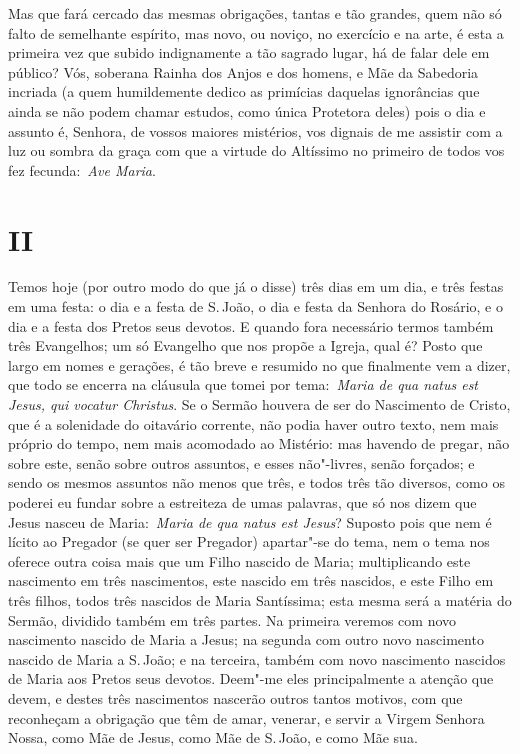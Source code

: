Mas que fará cercado das mesmas obrigações, tantas e tão
grandes, quem não só falto de semelhante espírito, mas novo, ou noviço,
no exercício e na arte, é esta a primeira vez que subido indignamente a
tão sagrado lugar, há de falar dele em público? Vós,
soberana Rainha dos Anjos e dos homens, e Mãe da Sabedoria incriada (a
quem humildemente dedico as primícias daquelas ignorâncias que ainda se
não podem chamar estudos, como única Protetora deles) pois o dia e
assunto é, Senhora, de vossos maiores mistérios, vos dignais de me
assistir com a luz ou sombra da graça com que a virtude do Altíssimo no
primeiro de todos vos fez fecunda:~\emph{Ave Maria}.


\section*{II}

Temos hoje (por outro modo do que já o disse) três dias em
um dia, e três festas em uma festa: o dia e a festa de S.\,João, o dia e
festa da Senhora do Rosário, e o dia e a festa dos Pretos seus devotos.
E quando fora necessário termos também três Evangelhos; um só Evangelho
que nos propõe a Igreja, qual é? Posto que largo em nomes e gerações, é
tão breve e resumido no que finalmente vem a dizer, que todo se encerra
na cláusula que tomei por tema:~\emph{Maria de qua natus est Jesus, qui
vocatur Christus}. Se o Sermão houvera de ser do Nascimento de Cristo,
que é a solenidade do oitavário corrente, não podia haver outro texto,
nem mais próprio do tempo, nem mais acomodado ao Mistério: mas havendo
de pregar, não sobre este, senão sobre outros assuntos, e esses
não"-livres, senão forçados; e sendo os mesmos assuntos não menos que
três, e todos três tão diversos, como os poderei eu fundar sobre a
estreiteza de umas palavras, que só nos dizem que Jesus nasceu de
Maria:~\emph{Maria de qua natus est Jesus}? Suposto pois que nem é
lícito ao Pregador (se quer ser Pregador) apartar"-se do tema, nem o tema
nos oferece outra coisa mais que um Filho nascido de Maria;
multiplicando este nascimento em três nascimentos, este nascido em três
nascidos, e este Filho em três filhos, todos três nascidos de Maria
Santíssima; esta mesma será a matéria do Sermão, dividido também em três
partes. Na primeira veremos com novo nascimento nascido de Maria a
Jesus; na segunda com outro novo nascimento nascido de Maria a S.\,João;
e na terceira, também com novo nascimento nascidos de Maria aos Pretos
seus devotos. Deem"-me eles principalmente a atenção que devem, e destes
três nascimentos nascerão outros tantos motivos, com que reconheçam a
obrigação que têm de amar, venerar, e servir a Virgem Senhora Nossa,
como Mãe de Jesus, como Mãe de S.\,João, e como Mãe sua.

